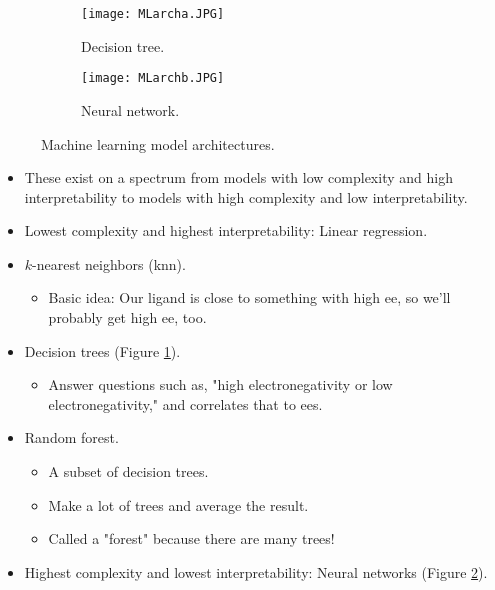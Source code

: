 \documentclass[../notes.tex]{subfiles}
\begin{document}
\begin{itemize}
    \begin{figure}[h!]
        \centering
        \begin{subfigure}[b]{0.2\linewidth}
            \centering
            \texttt{[image: MLarcha.JPG]}
            \caption{Decision tree.}
            \label{fig:MLarcha}
        \end{subfigure}
        \begin{subfigure}[b]{0.2\linewidth}
            \centering
            \texttt{[image: MLarchb.JPG]}
            \caption{Neural network.}
            \label{fig:MLarchb}
        \end{subfigure}
        \caption{Machine learning model architectures.}
        \label{fig:MLarch}
    \end{figure}
    \begin{itemize}
        \item These exist on a spectrum from models with low complexity and high interpretability to models with high complexity and low interpretability.
        \item Lowest complexity and highest interpretability: Linear regression.
        \item $k$-nearest neighbors (knn).
        \begin{itemize}
            \item Basic idea: Our ligand is close to something with high ee, so we'll probably get high ee, too.
        \end{itemize}
        \item Decision trees (Figure \ref{fig:MLarcha}).
        \begin{itemize}
            \item Answer questions such as, "high electronegativity or low electronegativity," and correlates that to ees.
        \end{itemize}
        \item Random forest.
        \begin{itemize}
            \item A subset of decision trees.
            \item Make a lot of trees and average the result.
            \item Called a "forest" because there are many trees!
        \end{itemize}
        \item Highest complexity and lowest interpretability: Neural networks (Figure \ref{fig:MLarchb}).
        \begin{itemize}

\end{itemize}
\end{itemize}
\end{itemize}
\end{document}
